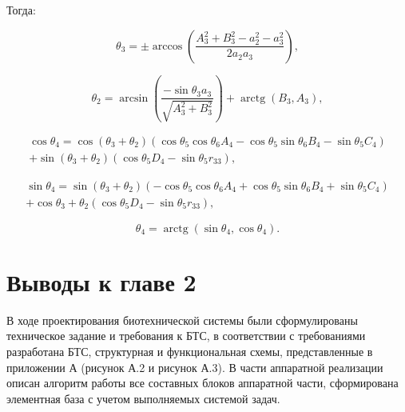 Тогда:

\begin{equation}
\theta_{3}=\pm \arccos \left(\frac{A_{3}^{2}+B_{3}^{2}-a_{2}^{2}-a_{3}^{2}}{2 a_{2} a_{3}}\right),
\end{equation}

\begin{equation}
\theta_{2}=\arcsin \left(\frac{-\operatorname{sin} \theta_{3} a_{3}}{\sqrt{A_{3}^{2}+B_{3}^{2}}}\right)+\operatorname{arctg}\left(B_{3}, A_{3}\right),
\end{equation}

\begin{equation}
\begin{aligned}
\operatorname{cos} \theta_{4}=\operatorname{cos}\left(\theta_{3}+\theta_{2}\right)\left(\operatorname{cos}\theta_{5} \operatorname{cos}\theta_{6} A_{4}-\operatorname{cos}\theta_{5} \operatorname{sin}\theta_{6} B_{4}-\operatorname{sin}\theta_{5} C_{4}\right)\\ + \operatorname{sin}\left(\theta_{3}+\theta_{2}\right)\left(\operatorname{cos} \theta_{5} D_{4}-\operatorname{sin} \theta_{5} r_{33}\right),
\end{aligned}
\end{equation}

\begin{equation}
\begin{aligned}
\operatorname{sin}\theta_{4}=\operatorname{sin}\left(\theta_{3}+\theta_{2}\right)\left(-\operatorname{cos} \theta_{5} \operatorname{cos} \theta_{6} A_{4}+\operatorname{cos} \theta_{5} \operatorname{sin} \theta_{6}B_{4}+\operatorname{sin} \theta_{5}C_{4}\right)\\+\operatorname{cos}{\theta_{3}+\theta_{2}}\left(\operatorname{cos} \theta_{5} D_{4}-\operatorname{sin} \theta_{5} r_{33}\right),
\end{aligned}
\end{equation}


\begin{equation}
{\theta_{4}=\operatorname{arctg}\left(\operatorname{sin} \theta_{4}, \operatorname{cos} \theta_{4}\right)}.
\end{equation}



\section{Выводы к главе 2}
В ходе проектирования биотехнической системы были сформулированы техническое задание и требования к БТС, в соответствии с требованиями разработана БТС, структурная и функциональная схемы, представленные в приложении А (рисунок А.2 и рисунок А.3). В части аппаратной реализации описан алгоритм работы все составных блоков аппаратной части, сформирована элементная база с учетом выполняемых системой задач. 
